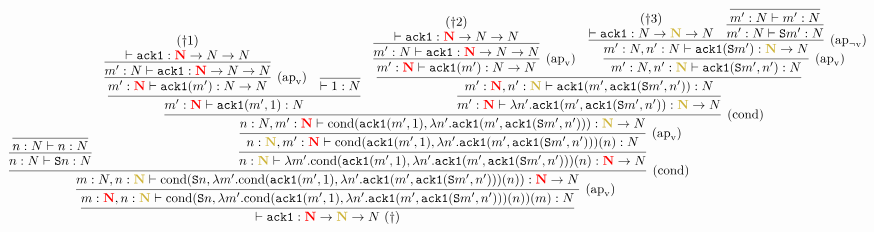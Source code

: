 \documentclass{article}
\newcommand{\bfColor}[2]{{\bf \color{#1}{#2}}}
\newcommand{\Rapv}{\hbox{$(\text{ap}_{\text{v}})$}}
\newcommand{\RapNv}{\hbox{$(\text{ap}_{\lnot\text{v}})$}}
\newcommand{\Rcond}{\hbox{$(\text{cond})$}}
\newcommand{\AckA}{{\tt ack1}}
\newcommand{\Cond}[2]{\text{cond}(#1,#2)}
\newcommand{\Suc}[1]{{\tt S}#1}
\newcommand{\N}{N}
\newcommand{\gN}{\bfColor{oldgold}{N}}
\newcommand{\rN}{\bfColor{red}{N}}
\begin{document}
{\scriptsize
  \hspace{-3cm}
  $\infer{
    \vdash \AckA:\rN\to\gN\to\N\ (\dagger)
  }{
    \infer[\Rapv]{
      m:\rN, n:\gN \vdash \Cond{\Suc{n}}{\lambda m'.\Cond{\AckA(m',1)}{\lambda n'.\AckA(m',\AckA(\Suc{m'},n'))}(n)}(m): \N
    }{
      \infer[\Rcond]{
        m:\N, n:\gN \vdash \Cond{\Suc{n}}{\lambda m'.\Cond{\AckA(m',1)}{\lambda n'.\AckA(m',\AckA(\Suc{m'},n'))}(n)}: \rN\to\N
      }{
        \infer{
          n:\N \vdash \Suc{n}: \N
        }{
          \infer{
            n:\N \vdash n: \N
          }{}
        }
        &
        \infer{
          n:\gN \vdash \lambda m'.\Cond{\AckA(m',1)}{\lambda n'.\AckA(m',\AckA(\Suc{m'},n'))}(n): \rN\to\N
        }{
          \infer[\Rapv]{
            n:\gN, m':\rN \vdash \Cond{\AckA(m',1)}{\lambda n'.\AckA(m',\AckA(\Suc{m'},n'))}(n): \N
          }{
            \infer[\Rcond]{
              n:\N, m':\rN \vdash \Cond{\AckA(m',1)}{\lambda n'.\AckA(m',\AckA(\Suc{m'},n'))}: \gN\to\N
            }{
              \infer{
                m':\rN \vdash \AckA(m',1):\N
              }{
                \infer[\Rapv]{
                  m':\rN \vdash \AckA(m'):\N\to\N
                }{
                  \infer{
                    m':\N \vdash \AckA:\rN\to\N\to\N
                  }{
                    \deduce{
                      \vdash \AckA:\rN\to\N\to\N
                    }{(\dagger1)}
                  }
                }
                &
                \infer{
                  \vdash 1:\N
                }{}
              }
              &
              \infer{
                m':\rN \vdash \lambda n'.\AckA(m',\AckA(\Suc{m'},n')): \gN\to\N
              }{
                \infer{
                  m':\rN, n':\gN \vdash \AckA(m',\AckA(\Suc{m'},n')): \N
                }{
                  \infer[\Rapv]{
                    m':\rN \vdash \AckA(m'): \N\to\N
                  }{
                    \infer{
                      m':\N \vdash \AckA: \rN\to\N\to\N
                    }{
                      \deduce{
                        \vdash \AckA: \rN\to\N\to\N
                      }{(\dagger2)}
                    }
                  }
                  &
                  \infer[\Rapv]{
                    m':\N, n':\gN \vdash \AckA(\Suc{m'},n'): \N
                  }{
                    \infer[\RapNv]{
                      m':\N, n':\N \vdash \AckA(\Suc{m'}): \gN\to\N
                    }{
                      \deduce{
                        \vdash \AckA:\N\to\gN\to\N
                      }{
                        (\dagger3)
                      }
                      &
                      \infer{
                        m':\N \vdash \Suc{m'}:\N
                      }{
                        \infer{
                          m':\N \vdash m':\N
                        }{}
                      }
                    }
                  }
                }
              }
            }
          }
        }
      }
    }
  }$  
}
\end{document}
